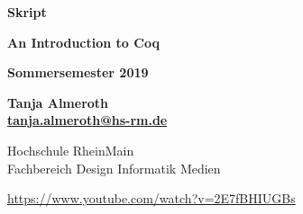 \documentclass[11pt, a4paper, twoside, bibliography=totoc]{scrartcl}
\makeatletter
\newcommand{\docutyp}{Skript}
\newcommand{\lecture}{An Introduction to Coq}
\newcommand{\docudate}{Sommersemester 2019}
\newcommand{\institution}{{\Large Hochschule RheinMain}\\
                          Fachbereich Design Informatik Medien}
\newcommand{\lecturer}{Tanja Almeroth}
\newcommand{\lectureremail}{\href{mailto:tanja.almeroth@hs-rm.de}{tanja.almeroth@hs-rm.de}}
\makeatother
\begin{document}
\pagestyle{scrplain}

\begin{titlepage}

        \vspace{40pt}
	\begin{center}

                
		\vspace{20pt}
		\textbf{\Large {\docutyp}}
			
		\vspace{20pt}
		\textbf{\Huge \lecture}
			
		\vspace{20pt}
		\textbf{\docudate}

		\vspace{20pt}
		\textbf{\lecturer}\\
		\textbf{\lectureremail}
		
		\vspace{120pt}
		{\institution}\\
		
		\vfill			
		\vspace{20pt}
		
	\end{center}
	\newpage
\end{titlepage}

\cleardoublepage

\vspace{0.3\textheight} 

\vspace*{1.5cm}


\vspace*{1.5cm}
%
\begin{raggedleft}
\url{https://www.youtube.com/watch?v=2E7fBHIUGBs}\\[\smallskipamount]
\end{raggedleft}
\end{document}
